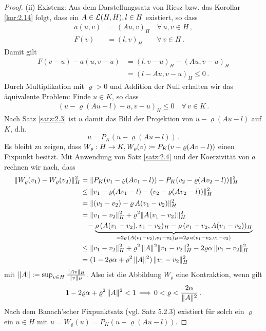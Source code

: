 \begin{itemize}
\begin{proof}
(ii) Existenz: Aus dem Darstellungssatz von Riesz bzw. das Korollar \ref{kor:2.14} folgt, dass ein $A \in \mathcal L(H,H), l \in H$ existiert, so dass
\begin{align*}
	a(u,v) &= (Au,v)_H \quad \forall \, u,v \in H\, , \\
	F(v) &= (l,v)_H \qquad \forall \, v \in H \, .
\end{align*}
Damit gilt
\begin{align*}
	  F(v-u) - a(u,v-u) &= (l,v-u)_H - (Au,v-u)_H \\
	 &=   (l-Au,v-u)_H \le 0 \, .
\end{align*}
Durch Multiplikation mit $\varrho > 0$ und Addition der Null erhalten wir das äquivalente Problem: Finde $u \in K$, so dass
\begin{align}
	(u-\varrho(Au-l)-u,v-u)_H \le 0 \quad \forall \, v \in K \, .
\end{align}
Nach Satz \ref{satz:2.3} ist $u$ damit das Bild der Projektion von $u-\varrho (Au-l)$ auf $K$, d.h.
\[
	u = P_K (u-\varrho (Au-l)) \,.
\]
Es bleibt zu zeigen, dass $W_\varrho : H \rightarrow K, W_\varrho (v) \coloneqq P_K(v-\varrho (Av-l))$ einen Fixpunkt besitzt. Mit Anwendung von Satz \ref{satz:2.4} und der Koerzivität von $a$ rechnen wir nach, dass
\begin{align*}
	\lVert W_\varrho (v_1) - W_\varrho (v_2)\rVert_H^2  & = \lVert  P_K (v_1-\varrho (Av_1-l))- P_K (v_2-\varrho (Av_2-l))  \rVert_H^2 \\
	& \le \lVert v_1-\varrho (Av_1-l)- (v_2-\varrho (Av_2-l))  \rVert_H^2  \\
	& = \lVert (v_1-v_2)-\varrho \, A(v_1-v_2)  \rVert_H^2  \\
	& = \lVert v_1-v_2\rVert_H^2 + \varrho^2 \lVert A(v_1-v_2)\rVert^2_H \\
	& \ \ \, - \underbrace{ \varrho\, (A(v_1-v_2),v_1-v_2)_H - \varrho\, (v_1-v_2,A(v_1-v_2))_H}_{=2\varrho\, (A(v_1-v_2),v_1-v_2)_H  =2\varrho\, a(v_1-v_2,v_1-v_2)} \\
	& \le \lVert v_1-v_2\rVert_H^2 + \varrho^2\, \lVert A\rVert^2 \lVert v_1-v_2\rVert_H^2 - 2\varrho\alpha \, \lVert v_1-v_2\rVert_H^2 \\
	& = (1-2\varrho \alpha+\varrho^2 \, \lVert A\rVert^2) \,\lVert v_1-v_2\rVert_H^2
\end{align*}
mit $\lVert A\rVert := \sup_{v \in H} \frac{\lVert Av\rVert_H}{\lVert v\rVert_H}$. Also ist die Abbildung $W_\varrho$  eine Kontraktion, wenn gilt
\begin{align*}
	1-2\varrho \alpha+\varrho^2 \, \lVert A\rVert^2 < 1 \, \Longrightarrow\, 0 < \varrho < \frac {2\alpha}{\lVert A\rVert^2} \, .
\end{align*}
Nach dem Banach'scher Fixpunktsatz (vgl. \cite{Stoer} Satz 5.2.3) existiert für solch ein $\varrho$ ein $u \in H$ mit $u = W_\varrho (u) = P_K(u-\varrho (Au-l))$.


\end{proof}
\end{itemize}
